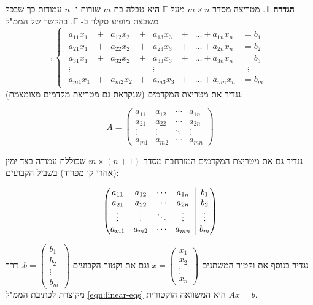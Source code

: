 \documentclass[12pt]{report}
\theoremstyle{plain}
\theoremstyle{definition}
\newtheorem{definition}[theorem]{הגדרה}
\newcommand{\F}{\mathbb{F}}
\newcommand{\0}{\mathbf{0}}
\begin{document}
\begin{definition}
מטריצה מסדר
$m\times n$
מעל
$\F$
היא טבלה בת
$m$
שורות ו-
$n$
עמודות כך שבכל משבצת מופיע סקלר ב-
$\F$.
בהקשר של הממ"ל
\begin{equation*}
,\begin{cases}
\begin{alignedat}{7}
a_{11}x_1 &{}+{}& a_{12}x_2 &{}+{}& a_{13}x_3 &{}+{}& \dots + a_{1n}x_n &= b_1 \\[4pt]
a_{21}x_1 &{}+{}& a_{22}x_2 &{}+{}& a_{23}x_3 &{}+{}& \dots + a_{2n}x_n &= b_2 \\[4pt]
a_{31}x_1 &{}+{}& a_{32}x_2 &{}+{}& a_{33}x_3 &{}+{}& \dots + a_{3n}x_n &= b_3 \\[4pt]
\vdots& & & & \vdots & & & \;\;\vdots \\[4pt]
a_{m1}x_1 &{}+{}& a_{m2}x_2 &{}+{}& a_{m3}x_3 &{}+{}& \dots + a_{mn}x_n &= b_m
\end{alignedat}
\end{cases}
\end{equation*}
נגדיר את מטריצת המקדמים (שנקראת גם מטריצת מקדמים מצומצמת):

$$
A=\begin{pmatrix}a_{11} & a_{12} & \cdots & a_{1n}\\
a_{21} & a_{22} & \cdots & a_{2n}\\
\vdots & \vdots & \ddots & \vdots\\
a_{m1} & a_{m2} & \cdots & a_{mn}
\end{pmatrix}
$$

נגדיר גם את מטריצת המקדמים המורחבת
מסדר
$m\times(n+1)$
שכוללת עמודה בצד ימין (אחרי קו מפריד) בשביל
הקבועים:

$$
\left( \begin{array}{@{}cccc|c@{}}
	a_{11} & a_{12} & \cdots & a_{1n} & b_1 \\
	a_{21} & a_{22} & \cdots & a_{2n} & b_2 \\
	\vdots & \vdots & \ddots & \vdots & \vdots \\
	a_{m1} & a_{m2} & \cdots & a_{mn} & b_m
\end{array} \right)
$$

נגדיר בנוסף את וקטור המשתנים
$x=\begin{pmatrix}x_1\\
x_2\\
\vdots\\
x_n
\end{pmatrix}$
וגם את וקטור הקבועים
$b=\begin{pmatrix}b_1\\
b_2\\
\vdots\\
b_m
\end{pmatrix}$.
דרך מקוצרת לכתיבת הממ"ל 
\ref{eqn:linear-eqs}
היא המשוואה הוקטורית
$Ax=b$.
\end{definition}
\end{document}
